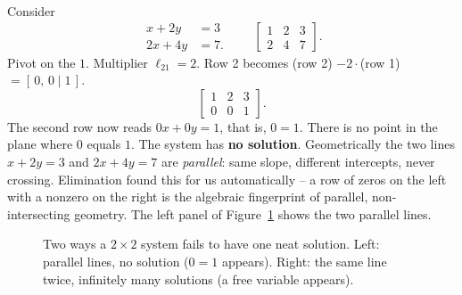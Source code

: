 Consider
\[
\begin{aligned}
x + 2y &= 3\\
2x + 4y &= 7.
\end{aligned}
\qquad
\left[\begin{array}{cc|c}
1 & 2 & 3\\
2 & 4 & 7
\end{array}\right].
\]
Pivot on the $1$. Multiplier $\ell_{21}=2$. Row 2 becomes (row 2) $-2\cdot$(row
1) $= [\,0,\,0\mid 1\,]$.
\[
\left[\begin{array}{cc|c}
1 & 2 & 3\\
0 & 0 & 1
\end{array}\right].
\]
The second row now reads $0x + 0y = 1$, that is, $0 = 1$. There is no point in
the plane where $0$ equals $1$. The system has \textbf{no solution}.
Geometrically the two lines $x+2y=3$ and $2x+4y=7$ are \emph{parallel}: same
slope, different intercepts, never crossing. Elimination found this for us
automatically -- a row of zeros on the left with a nonzero on the right is the
algebraic fingerprint of parallel, non-intersecting geometry. The left panel of
Figure~\ref{ch07:singular-lines} shows the two parallel lines.

\begin{figure}[H]
\centering
{}
\caption{Two ways a $2\times 2$ system fails to have one neat solution. Left:
parallel lines, no solution ($0=1$ appears). Right: the same line twice,
infinitely many solutions (a free variable appears).}
\label{ch07:singular-lines}
\end{figure}


